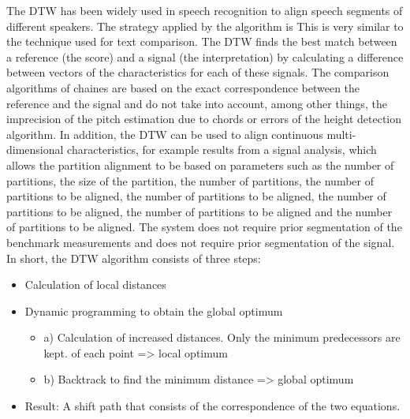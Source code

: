 \documentclass{article}
\begin{document}
The DTW has been widely used in speech recognition to align speech segments of different speakers. The strategy applied by the algorithm is This is very similar to the technique used for text comparison. The DTW finds the best match between a reference (the score) and a signal (the interpretation) by calculating a difference between vectors of the characteristics for each of these signals. The comparison algorithms of chaines are based on the exact correspondence between the reference and the signal and do not take into account, among other things, the imprecision of the pitch estimation due to chords or errors of the height detection algorithm. In addition, the DTW can be used to align continuous multi-dimensional characteristics, for example results from a signal analysis, which allows the partition alignment to be based on parameters such as the number of partitions, the size of the partition, the number of partitions, the number of partitions to be aligned, the number of partitions to be aligned, the number of partitions to be aligned, the number of partitions to be aligned and the number of partitions to be aligned.
The system does not require prior segmentation of the benchmark measurements and does not require prior segmentation of the
signal.
In short, the DTW algorithm consists of three steps:

\begin{itemize}
    \item Calculation of local distances
    \item Dynamic programming to obtain the global optimum \begin{itemize}
        \item a) Calculation of increased distances. Only the minimum predecessors are kept. of each point => local optimum
        \item b) Backtrack to find the minimum distance => global optimum
    \end{itemize}
    \item Result: A shift path that consists of the correspondence of the two equations.
    
\end{itemize}
\end{document}
